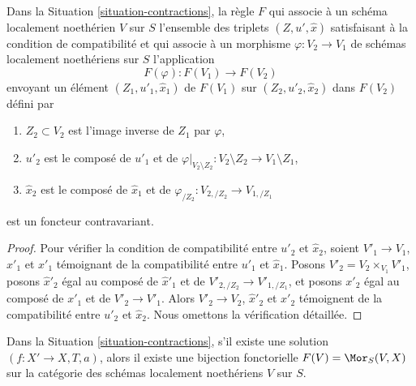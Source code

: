 \begin{lemma}
\label{lemma-functor}
Dans la Situation \ref{situation-contractions}, la règle $F$ qui associe
à un schéma localement noethérien $V$ sur $S$ l'ensemble des triplets
$(Z, u', \hat x)$ satisfaisant à la condition de compatibilité et qui associe à
un morphisme $\varphi : V_2 \to V_1$ de schémas localement noethériens sur $S$
l'application
$$
F(\varphi) : F(V_1) \longrightarrow F(V_2)
$$
envoyant un élément $(Z_1, u'_1, \hat x_1)$ de $F(V_1)$ sur
$(Z_2, u'_2, \hat x_2)$ dans $F(V_2)$ défini par
\begin{enumerate}
\item $Z_2 \subset V_2$ est l'image inverse de $Z_1$ par $\varphi$,
\item $u'_2$ est le composé de $u'_1$ et de
$\varphi|_{V_2 \setminus Z_2} : V_2 \setminus Z_2 \to V_1 \setminus Z_1$,
\item $\hat x_2$ est le composé de $\hat x_1$ et de
$\varphi_{/Z_2} : V_{2, /Z_2} \to V_{1, /Z_1}$
\end{enumerate}
est un foncteur contravariant.
\end{lemma}

\begin{proof}
Pour vérifier la condition de compatibilité entre $u'_2$ et $\hat x_2$, soient
$V'_1 \to V_1$, $\hat x'_1$ et $x'_1$ témoignant de la compatibilité entre
$u'_1$ et $\hat x_1$. Posons $V'_2 = V_2 \times_{V_1} V'_1$, posons
$\hat x'_2$ égal au composé de $\hat x'_1$ et de
$V'_{2, /Z_2} \to V'_{1, /Z_1}$, et posons $x'_2$
égal au composé de $x'_1$ et de $V'_2 \to V'_1$.
Alors $V'_2 \to V_2$, $\hat x'_2$ et $x'_2$ témoignent de la compatibilité entre
$u'_2$ et $\hat x_2$. Nous omettons la vérification détaillée.
\end{proof}

\begin{lemma}
\label{lemma-solution}
Dans la Situation \ref{situation-contractions}, s'il existe une solution
$(f : X' \to X, T, a)$, alors il existe une bijection fonctorielle
$F(V) = \Mor_S(V, X)$ sur la catégorie des
schémas localement noethériens $V$ sur $S$.
\end{lemma}

